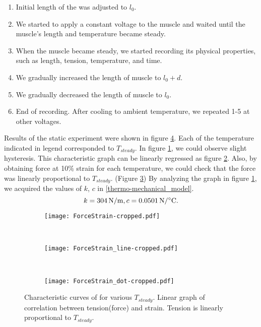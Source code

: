 \begin{enumerate}
	\item Initial length of the \scp was adjusted to $l_0$.
	\item We started to apply a constant voltage to the muscle and waited until the muscle's length and temperature became steady.
	\item When the muscle became steady, we started recording its physical properties, such as length, tension, temperature, and time.
	\item We gradually increased the length of muscle to $l_0+d$.
	\item We gradually decreased the length of muscle to $l_0$.
	\item End of recording. After cooling to ambient temperature, we repeated 1-5 at other voltages.
\end{enumerate}

Results of the static experiment were shown in figure \ref{static1_results}. Each of the temperature indicated in legend corresponded to $T_{steady}$. In figure \ref{static1_result}, we could observe slight hysteresis. This characteristic graph can be linearly regressed as figure \ref{static1_line}. Also, by obtaining force at 10\% strain for each temperature, we could check that the force was linearly proportional to $T_{steady}$. (Figure \ref{static1_dot}) By analyzing the graph in figure \ref{static1_result}, we acquired the values of $k$, $c$ in \eqref{thermo-mechanical_model}.
\begin{equation}
k=\SI{304}{\newton\per\meter}, c=\SI{0.0501}{\newton\per\degreeCelsius}. \notag
\end{equation}

\begin{figure}[t]
	\centering
	\begin{subfigure}[t]{0.32\textwidth}
		\texttt{[image: ForceStrain-cropped.pdf]}
		\caption{\label{static1_result}}
	\end{subfigure}
	~
	\begin{subfigure}[t]{0.32\textwidth}
		\texttt{[image: ForceStrain\_line-cropped.pdf]}
		\caption{\label{static1_line}}
	\end{subfigure}
	~
	\begin{subfigure}[t]{0.32\textwidth}
		\texttt{[image: ForceStrain\_dot-cropped.pdf]}
		\caption{\label{static1_dot}}
	\end{subfigure}
	\caption[Results of the static experiment]{ Characteristic curves of \scp for various $T_{steady}$.  Linear graph of correlation between tension(force) and strain.  Tension is linearly proportional to $T_{steady}$.}
	\label{static1_results}
\end{figure}

